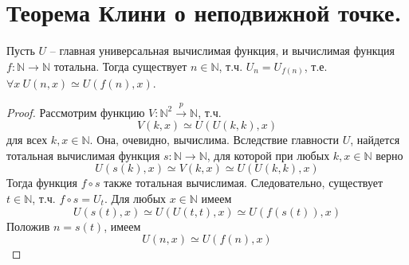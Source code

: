 \section{Теорема Клини о неподвижной точке.}

\begin{theorem}
  Пусть $U$ -- главная универсальная вычислимая функция, и вычислимая функция $f : \mathbb{N} \to \mathbb{N}$ тотальна. Тогда существует $n \in \mathbb{N}$, т.ч. $U_n = U_{f(n)}$, т.е. $\forall x \> U(n,x) \simeq U(f(n), x)$.
  \begin{proof}
    Рассмотрим функцию $V : \mathbb{N}^2 \overset{p}{\to} \mathbb{N}$, т.ч.
    \[
      V(k, x) \simeq U(U(k,k), x)
    \]
    для всех $k,x \in \mathbb{N}$. Она, очевидно, вычислима. Вследствие главности $U$, найдется тотальная вычислимая функция $s : \mathbb{N} \to \mathbb{N}$, для которой при любых $k,x \in \mathbb{N}$ верно
    \[
      U(s(k), x) \simeq V(k,x) \simeq U(U(k,k), x)
    \]
    Тогда функция $f \circ s$ также тотальная вычислимая. Следовательно, существует $t \in \mathbb{N}$, т.ч. $f \circ s = U_t$. Для любых $x \in \mathbb{N}$ имеем
    \[
      U(s(t), x) \simeq U(U(t,t), x) \simeq U(f(s(t)), x)
    \]
    Положив $n = s(t)$, имеем
    \[
      U(n, x) \simeq U(f(n), x)
    \]
  \end{proof}
\end{theorem}